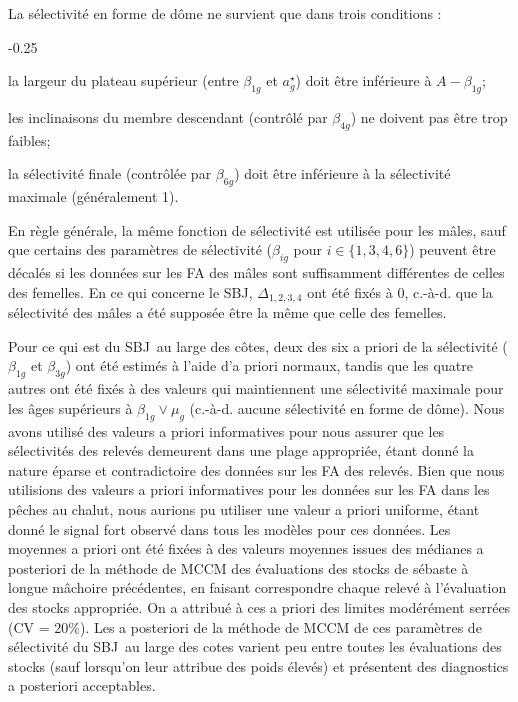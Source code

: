 \documentclass[11pt]{book}
\newcommand{\pc}{\%}
\begin{document}
La s\'{e}lectivit\'{e} en forme de d\^{o}me ne survient que dans trois conditions :\\
\begin{itemize_csas}{-0.25}{}
  \item la largeur du plateau sup\'{e}rieur (entre $\beta_{1g}$ et $a_g^{\star}$) doit \^{e}tre inf\'{e}rieure \`{a} $A - \beta_{1g}$;
  \item les inclinaisons du membre descendant (contr\^{o}l\'{e} par $\beta_{4g}$) ne doivent pas \^{e}tre trop faibles;
  \item la s\'{e}lectivit\'{e} finale (contr\^{o}l\'{e}e par $\beta_{6g}$) doit \^{e}tre inf\'{e}rieure \`{a} la s\'{e}lectivit\'{e} maximale (g\'{e}n\'{e}ralement 1).
\end{itemize_csas}
En r\`{e}gle g\'{e}n\'{e}rale, la m\^{e}me fonction de s\'{e}lectivit\'{e} est utilis\'{e}e pour les m\^{a}les, sauf que certains des param\`{e}tres de s\'{e}lectivit\'{e} ($\beta_{ig}$ pour $i\in \{1,3,4,6\}$) peuvent \^{e}tre d\'{e}cal\'{e}s si les donn\'{e}es sur les FA des m\^{a}les sont suffisamment diff\'{e}rentes de celles des femelles.
En ce qui concerne le SBJ, $\Delta_{1,2,3,4}$ ont \'{e}t\'{e} fix\'{e}s \`{a} 0, c.-\`{a}-d. que la s\'{e}lectivit\'{e} des m\^{a}les a \'{e}t\'{e} suppos\'{e}e \^{e}tre la m\^{e}me que celle des femelles.

Pour ce qui est du SBJ~au large des c\^{o}tes, deux des six a priori de la s\'{e}lectivit\'{e} ($\beta_{1g}$ et $\beta_{3g}$) ont \'{e}t\'{e} estim\'{e}s \`{a} l'aide d'a priori normaux, tandis que les quatre autres ont \'{e}t\'{e} fix\'{e}s \`{a} des valeurs qui maintiennent une s\'{e}lectivit\'{e} maximale pour les \^{a}ges sup\'{e}rieurs \`{a} $\beta_{1g} \vee \mu_g$ (c.-\`{a}-d. aucune s\'{e}lectivit\'{e} en forme de d\^{o}me).
Nous avons utilis\'{e} des valeurs a priori informatives pour nous assurer que les s\'{e}lectivit\'{e}s des relev\'{e}s demeurent dans une plage appropri\'{e}e, \'{e}tant donn\'{e} la nature \'{e}parse et contradictoire des donn\'{e}es sur les FA des relev\'{e}s.
Bien que nous utilisions des valeurs a priori informatives pour les donn\'{e}es sur les FA dans les p\^{e}ches au chalut, nous aurions pu utiliser une valeur a priori uniforme, \'{e}tant donn\'{e} le signal fort observ\'{e} dans tous les mod\`{e}les pour ces donn\'{e}es.
Les moyennes a priori ont \'{e}t\'{e} fix\'{e}es \`{a} des valeurs moyennes issues des m\'{e}dianes a posteriori de la m\'{e}thode de MCCM des \'{e}valuations des stocks de s\'{e}baste \`{a} longue m\^{a}choire pr\'{e}c\'{e}dentes, en faisant correspondre chaque relev\'{e} \`{a} l'\'{e}valuation des stocks appropri\'{e}e.
On a attribu\'{e} \`{a} ces a priori des limites mod\'{e}r\'{e}ment serr\'{e}es (CV = 20\pc).
Les a posteriori de la m\'{e}thode de MCCM de ces param\`{e}tres de s\'{e}lectivit\'{e} du SBJ~au large des cotes varient peu entre toutes les \'{e}valuations des stocks (sauf lorsqu'on leur attribue des poids \'{e}lev\'{e}s) et pr\'{e}sentent des diagnostics a posteriori acceptables.
\end{document}
